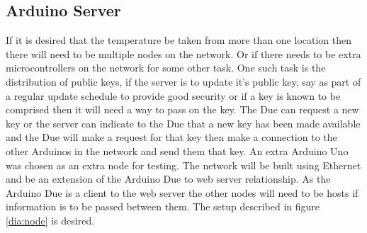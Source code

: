 \subsection{Arduino Server}

If it is desired that the temperature be taken from more than one location then there will need to be multiple nodes on the network. Or if there needs to be extra microcontrollers on the network for some other task. One such task is the distribution of public keys, if the server is to update it's public key, say as part of a regular update schedule to provide good security or if a key is known to be comprised then it will need a way to pass on the key. The Due can request a new key or the server can indicate to the Due that a new key has been made available and the Due will make a request for that key then make a connection to the other Arduinos in the network and send them that key. An extra Arduino Uno was chosen as an extra node for testing. The network will be built using Ethernet and be an extension of the Arduino Due to web server relationship. As the Arduino Due is a client to the web server the other nodes will need to be hosts if information is to be passed between them. The setup described in figure \ref{dia:node} is desired. 